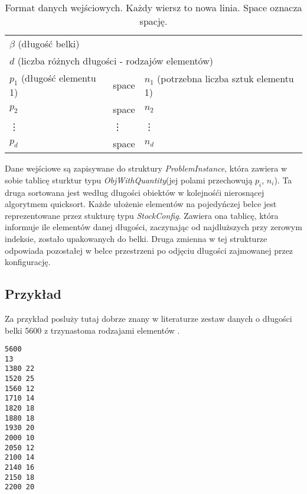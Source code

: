 \begin{table}[!h]
	\begin{center}
		\begin{tabular}{ p{5cm}p{2cm}p{7cm} }
			\multicolumn{3}{l}{$\beta$ (długość belki)} \\
			\multicolumn{3}{l}{$d$ (liczba różnych długości - rodzajów elementów)} \\
			$p_1$ (długość elementu 1) & space & $n_1$ (potrzebna liczba sztuk elementu 1)\\
			$p_2$ & space & $n_2$ \\
			\vdots & \vdots & \vdots \\
			$p_d$ & space & $n_d$ \\
		\end{tabular}
		\caption{Format danych wejściowych. Każdy wiersz to nowa linia. Space oznacza spację.}
	\end{center}
\end{table}
Dane wejściowe są zapisywane do struktury \textit{ProblemInstance}, która zawiera w sobie tablicę sturktur typu \textit{ObjWithQuantity}(jej polami przechowują $p_i$, $n_i$). Ta druga sortowana jest według długości obiektów w kolejnośći nierosnącej algorytmem quicksort.
Każde ułożenie elementów na pojedyńczej belce jest reprezentowane przez stukturę typu \textit{StockConfig}. Zawiera ona tablicę, która informuje ile elementów danej długości, zaczynając od najdluższych przy zerowym indeksie, zostało upakowanych do belki. Druga zmienna w tej strukturze odpowiada pozostałej w belce przestrzeni po odjęciu długości zajmowanej przez konfigurację.

\subsection{Przykład}\label{example}
Za przykład posluży tutaj dobrze znany w literaturze zestaw danych o długości belki 5600 z trzynastoma rodzajami elementów \cite{EXAMPLE_REF}.

\begin{lstlisting} 
5600
13
1380 22
1520 25
1560 12
1710 14
1820 18
1880 18
1930 20
2000 10
2050 12
2100 14
2140 16
2150 18
2200 20 
\end{lstlisting}

